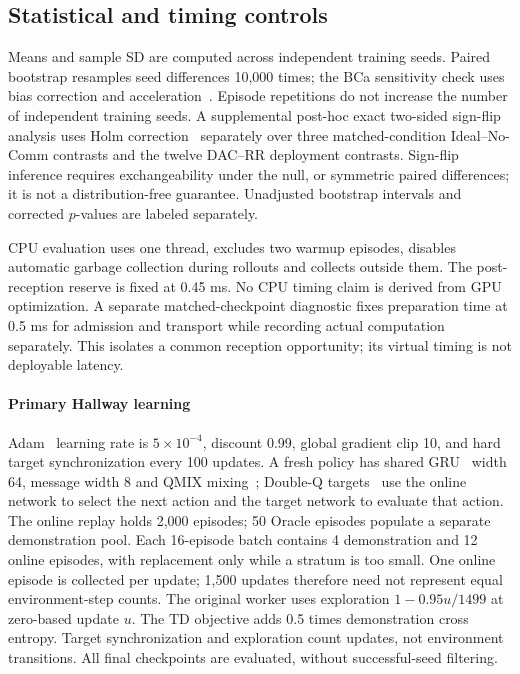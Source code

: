 \documentclass[pdflatex,sn-mathphys-num]{sn-jnl}
\begin{document}
\subsection{Statistical and timing controls}
Means and sample SD are computed across independent training seeds. Paired bootstrap resamples seed differences 10,000 times; the BCa sensitivity check uses bias correction and acceleration~\citep{efron1987better}. Episode repetitions do not increase the number of independent training seeds. A supplemental post-hoc exact two-sided sign-flip analysis uses Holm correction~\citep{holm1979simple} separately over three matched-condition Ideal--No-Comm contrasts and the twelve DAC--RR deployment contrasts. Sign-flip inference requires exchangeability under the null, or symmetric paired differences; it is not a distribution-free guarantee. Unadjusted bootstrap intervals and corrected $p$-values are labeled separately.

CPU evaluation uses one thread, excludes two warmup episodes, disables automatic garbage collection during rollouts and collects outside them. The post-reception reserve is fixed at 0.45 ms. No CPU timing claim is derived from GPU optimization. A separate matched-checkpoint diagnostic fixes preparation time at 0.5 ms for admission and transport while recording actual computation separately. This isolates a common reception opportunity; its virtual timing is not deployable latency.
\paragraph{Primary Hallway learning} Adam~\citep{kingma2015adam} learning rate is $5\times10^{-4}$, discount 0.99, global gradient clip 10, and hard target synchronization every 100 updates. A fresh policy has shared GRU~\citep{cho2014learning} width 64, message width 8 and QMIX mixing~\citep{rashid2018qmix}; Double-Q targets~\citep{hasselt2016deepdouble} use the online network to select the next action and the target network to evaluate that action. The online replay holds 2,000 episodes; 50 Oracle episodes populate a separate demonstration pool. Each 16-episode batch contains 4 demonstration and 12 online episodes, with replacement only while a stratum is too small. One online episode is collected per update; 1,500 updates therefore need not represent equal environment-step counts. The original worker uses exploration $1-0.95u/1499$ at zero-based update $u$. The TD objective adds 0.5 times demonstration cross entropy. Target synchronization and exploration count updates, not environment transitions. All final checkpoints are evaluated, without successful-seed filtering.
\end{document}
